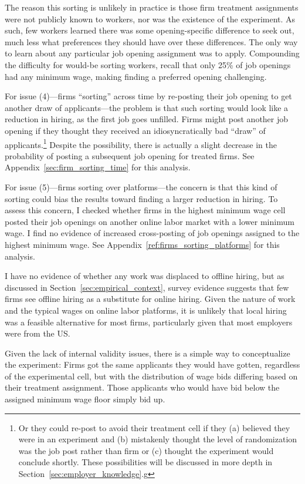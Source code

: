 \documentclass[AER]{AEA}
\begin{document}
The reason this sorting is unlikely in practice is those firm treatment assignments were not publicly known to workers, nor was the existence of the experiment.
As such, few workers learned there was some opening-specific difference to seek out, much less what preferences they should have over these differences. 
The only way to learn about any particular job opening assignment was to apply. 
Compounding the difficulty for would-be sorting workers, recall that only 25\% of job openings had any minimum wage, making finding a preferred opening challenging.  


For issue (4)---firms ``sorting'' across time by re-posting their job opening to get another draw of applicants---the problem is that such sorting would look like a reduction in hiring, as the first job goes unfilled. 
Firms might post another job opening if they thought they received an idiosyncratically bad ``draw'' of applicants.\footnote{
  Or they could re-post to avoid their treatment cell if they (a) believed they were in an experiment and (b) mistakenly thought the level of randomization was the job post rather than firm or (c) thought the experiment would conclude shortly.
  These possibilities will be discussed in more depth in Section~\ref{sec:employer_knowledge}.g
}
Despite the possibility, there is actually a slight decrease in the probability of posting a subsequent job opening for treated firms.
See Appendix~\ref{sec:firm_sorting_time} for this analysis. 


For issue (5)---firms sorting over platforms---the concern is that this kind of sorting could bias the results toward finding a larger reduction in hiring.
To assess this concern, I checked whether firms in the highest minimum wage cell posted their job openings on another online labor market with a lower minimum wage.
I find no evidence of increased cross-posting of job openings assigned to the highest minimum wage.
See Appendix~\ref{ref:firms_sorting_platforms} for this analysis. 


I have no evidence of whether any work was displaced to offline hiring, but as discussed in Section~\ref{sec:empirical_context}, survey evidence suggests that few firms see offline hiring as a substitute for online hiring. 
Given the nature of work and the typical wages on online labor platforms, it is unlikely that local hiring was a feasible alternative for most firms, particularly given that most employers were from the US.


Given the lack of internal validity issues, there is a simple way to conceptualize the experiment: 
Firms got the same applicants they would have gotten, regardless of the experimental cell, but with the distribution of wage bids differing based on their treatment assignment.
Those applicants who would have bid below the assigned minimum wage floor simply bid up.
\end{document}
